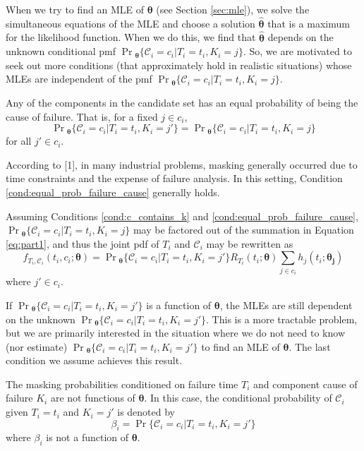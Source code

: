 \documentclass[
]{article}
\begin{document}
When we try to find an MLE of \(\boldsymbol{\theta}\) (see Section
\ref{sec:mle}), we solve the simultaneous equations of the MLE and
choose a solution \(\hat{\boldsymbol{\theta}}\) that is a maximum for
the likelihood function. When we do this, we find that
\(\hat{\boldsymbol{\theta}}\) depends on the unknown conditional pmf
\(\Pr{}_{\!\boldsymbol{\theta}}\{\mathcal{C}_i=c_i|T_i=t_i,K_i=j\}\).
So, we are motivated to seek out more conditions (that approximately
hold in realistic situations) whose MLEs are independent of the pmf
\(\Pr{}_{\!\boldsymbol{\theta}}\{\mathcal{C}_i=c_i|T_i=t_i,K_i=j\}\).

\begin{condition}
\label{cond:equal_prob_failure_cause}
Any of the components in the candidate set has an equal probability of being the
cause of failure.
That is, for a fixed $j \in c_i$,
$$
\Pr{}_{\!\boldsymbol{\theta}}\{\mathcal{C}_i=c_i|T_i=t_i,K_i=j'\} =
    \Pr{}_{\!\boldsymbol{\theta}}\{\mathcal{C}_i=c_i|T_i=t_i,K_i=j\}
$$
for all $j' \in c_i$.
\end{condition}

According to {[}1{]}, in many industrial problems, masking generally
occurred due to time constraints and the expense of failure analysis. In
this setting, Condition \ref{cond:equal_prob_failure_cause} generally
holds.

Assuming Conditions \ref{cond:c_contains_k} and
\ref{cond:equal_prob_failure_cause},
\(\Pr{}_{\!\boldsymbol{\theta}}\{\mathcal{C}_i=c_i|T_i=t_i,K_i=j\}\) may
be factored out of the summation in Equation \eqref{eq:part1}, and thus
the joint pdf of \(T_i\) and \(\mathcal{C}_i\) may be rewritten as \[
f_{T_i,\mathcal{C}_i}(t_i,c_i;\boldsymbol{\theta}) =
    \Pr{}_{\!\boldsymbol{\theta}}\{\mathcal{C}_i=c_i|T_i=t_i,K_i=j'\} R_{T_i}(t_i;\boldsymbol{\theta})
    \sum_{j \in c_i} h_j(t_i;\boldsymbol{\theta_j})
\] where \(j' \in c_i\).

If \(\Pr{}_{\!\boldsymbol{\theta}}\{\mathcal{C}_i=c_i|T_i=t_i,K_i=j'\}\)
is a function of \(\boldsymbol{\theta}\), the MLEs are still dependent
on the unknown
\(\Pr{}_{\!\boldsymbol{\theta}}\{\mathcal{C}_i=c_i|T_i=t_i,K_i=j'\}\).
This is a more tractable problem, but we are primarily interested in the
situation where we do not need to know (nor estimate)
\(\Pr{}_{\!\boldsymbol{\theta}}\{\mathcal{C}_i=c_i|T_i=t_i,K_i=j'\}\) to
find an MLE of \(\boldsymbol{\theta}\). The last condition we assume
achieves this result.

\begin{condition}
\label{cond:masked_indept_theta}
The masking probabilities conditioned on failure time $T_i$ and component cause
of failure $K_i$ are not functions of $\boldsymbol{\theta}$. In this case, the conditional
probability of $\mathcal{C}_i$ given $T_i=t_i$ and $K_i=j'$ is denoted by
$$
\beta_i = \Pr\{\mathcal{C}_i=c_i | T_i=t_i, K_i=j'\}
$$
where $\beta_i$ is not a function of $\boldsymbol{\theta}$.
\end{condition}
\end{document}
